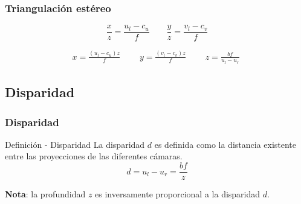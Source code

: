 \begin{frame}
\frametitle{Triangulación estéreo}

\begin{equation}
\frac{x}{z}=\frac{u_{l}-c_{u}}{f}\qquad\frac{y}{z}=\frac{v_{l}-c_{v}}{f}
\end{equation}

\begin{equation}
\begin{aligned}x=\frac{(u_{l}-c_{u})z}{f}\;\qquad
y=\frac{(v_{l}-c_{v})z}{f}\;\qquad
z=\frac{bf}{u_{l}-u_{r}}\;
\end{aligned}
\end{equation}

\begin{figure}[!htb]
	\centering
	\hfill
	\centering
	\hfill
\end{figure}
\end{frame}


\subsection{Disparidad}


\begin{frame}
\frametitle{Disparidad}

\begin{block}{Definición - Disparidad}
La disparidad $d$ es definida como la distancia existente entre las proyecciones de las diferentes cámaras.
\begin{equation}
d=u_{l}-u_{r}=\frac{bf}{z}
\end{equation}
\end{block}

\textbf{Nota}: la profundidad $z$ es inversamente proporcional a la disparidad $d$.

\end{frame}

